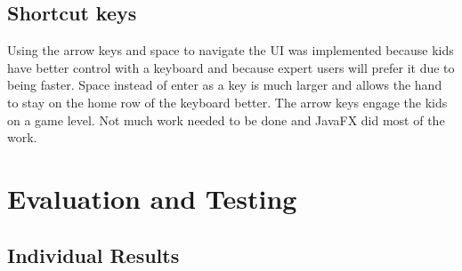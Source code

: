 \documentclass[conference]{IEEEtran}
\begin{document}
	\subsection{Shortcut keys}
		Using the arrow keys and space to navigate the UI was implemented because kids have better control with a keyboard and because expert users will prefer it due to being faster. Space instead of enter as a key is much larger and allows the hand to stay on the home row of the keyboard better. The arrow keys engage the kids on a game level. Not much work needed to be done and JavaFX did most of the work.

\section{Evaluation and Testing}
	\subsection{Individual Results}
\end{document}
